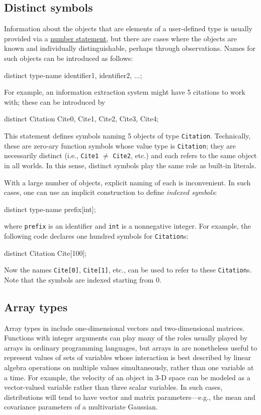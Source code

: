 \documentclass[12pt]{article}
\begin{document}
\subsection{Distinct symbols}\label{distinct-section}
Information about the objects that are elements of a user-defined type
is usually provided via a \hyperref[number-section]{number statement}, but there are cases
where the objects are known and individually distinguishable, perhaps through observations.
Names for such objects can be introduced as follows:
\begin{blogcode}
distinct type-name identifier1, identifier2, ...;
\end{blogcode}
For example, an information extraction system might have 5 citations to work with;
these can be introduced by
\begin{blogcode}
distinct Citation Cite0, Cite1, Cite2, Cite3, Cite4;
\end{blogcode}
This statement defines symbols naming 5 objects of type {\tt Citation}.
Technically, these are zero-ary function symbols whose value type is {\tt Citation};
they are necessarily distinct  (i.e., {\tt Cite1} $\neq$ {\tt Cite2}, etc.)
and each refers to the same object in all worlds. In this sense,
distinct symbols play the same role as built-in literals.

With a large number of objects, explicit naming of each is inconvenient.
In such cases, one can use an implicit construction to define {\em indexed symbols}:
\begin{blogcode}
distinct type-name prefix[int];
\end{blogcode}
where {\tt prefix} is an identifier and {\tt int} is a nonnegative integer.
For example, the following \bl code declares one hundred symbols for {\tt Citation}s:
\begin{blogcode}
distinct Citation Cite[100];
\end{blogcode}
Now the names \verb|Cite[0]|, \verb|Cite[1]|, etc., can be used to refer to these {\tt Citation}s. Note that the symbols are indexed starting from 0.


\subsection{Array types}\label{array-section}

Array types in \bl include one-dimensional vectors and two-dimensional
matrices. Functions with integer arguments can play many of the roles
usually played by arrays in ordinary programming languages, but arrays in
\bl are nonetheless useful to represent values of sets of variables
whose interaction is best described by linear algebra operations on
multiple values simultaneously, rather than one variable at a time.
For example, the velocity of an object in 3-D space can be modeled
as a vector-valued variable rather than three scalar variables.
In such cases, distributions will tend to have vector and matrix
parameters---e.g., the mean and covariance parameters of a
multivariate Gaussian.
\end{document}
